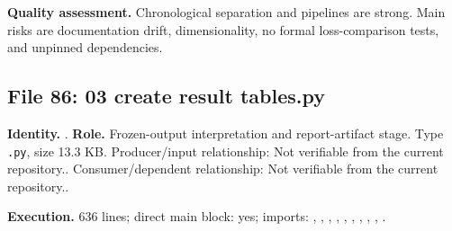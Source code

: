 \documentclass[
  11pt,
  a4paper]{article}
\begin{document}
\textbf{Quality assessment.} Chronological separation and pipelines are
strong. Main risks are documentation drift, dimensionality, no formal
loss-comparison tests, and unpinned dependencies.

\subsection{File 86: 03 create result
tables.py}\label{file-4918584787228544207}

\textbf{Identity.}
.
\textbf{Role.} Frozen-output interpretation and report-artifact stage.
Type \texttt{.py}, size 13.3 KB. Producer/input relationship: Not
verifiable from the current repository.. Consumer/dependent
relationship: Not verifiable from the current repository..

\textbf{Execution.} 636 lines; direct main block: yes; imports:
, , ,
,
,
, ,
, , .
\end{document}
